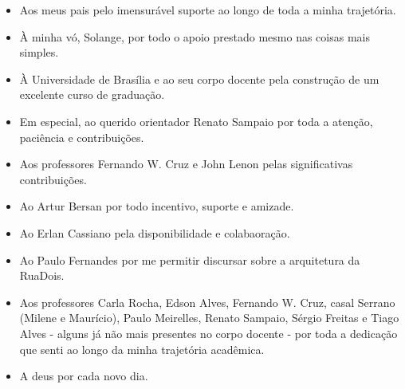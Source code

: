 \begin{agradecimentos}
\begin{itemize}[label={}]
    \item Aos meus pais pelo imensurável suporte ao longo de toda a minha trajetória.
    \item À minha vó, Solange, por todo o apoio prestado mesmo nas coisas mais simples.
    \item À Universidade de Brasília e ao seu corpo docente pela construção de um excelente curso de graduação.
    \item Em especial, ao querido orientador Renato Sampaio por toda a atenção, paciência e contribuições.
    \item Aos professores Fernando W. Cruz e John Lenon pelas significativas contribuições.
    \item Ao Artur Bersan por todo incentivo, suporte e amizade.
    \item Ao Erlan Cassiano pela disponibilidade e colabaoração.
    \item Ao Paulo Fernandes por me permitir discursar sobre a arquitetura da RuaDois.
    \item Aos professores Carla Rocha, Edson Alves, Fernando W. Cruz, casal Serrano (Milene e Maurício),
    Paulo Meirelles, Renato Sampaio, Sérgio Freitas e Tiago Alves - alguns já não mais presentes no
    corpo docente - por toda a dedicação que senti ao longo da minha trajetória acadêmica.
    \item A deus por cada novo dia.
\end{itemize}
\end{agradecimentos}
